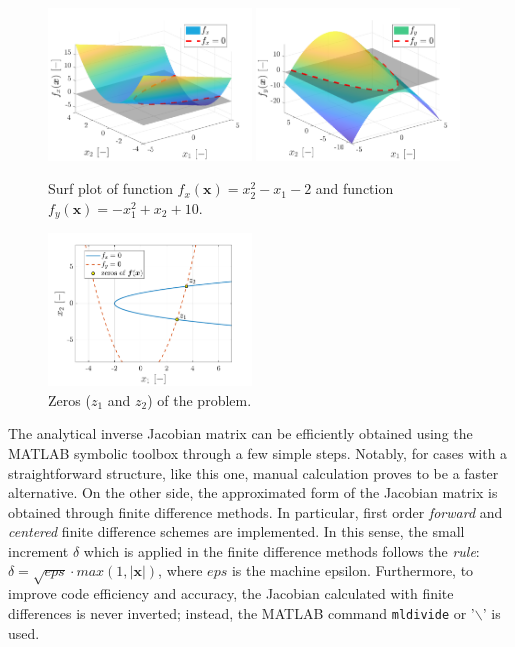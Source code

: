 \documentclass[11pt,a4paper,oneside]{article}
\renewcommand{\vec}[1]{\mathbf{#1}}
\begin{document}
\begin{figure}[h]
    \centering
    \includegraphics[width = 0.48\textwidth]{gfx/ex1_1.pdf}
    \includegraphics[width = 0.48\textwidth]{gfx/ex1_2.pdf}
    \caption{Surf plot of function $f_x(\vec{x})=x_2^2-x_1-2$ and function $f_y(\vec{x})=-x_1^2+x_2+10$.}\label{fig:ex1_1}
\end{figure}

\begin{figure}
    \centering
    \vspace{-0.3cm}
    
        \includegraphics[width = 0.48\textwidth]{gfx/ex1_3.pdf}
        \caption{Zeros ($z_1$ and $z_2$) of the problem.}\label{fig:ex1_2}
\end{figure}
The analytical inverse Jacobian matrix can be efficiently obtained using the MATLAB symbolic toolbox 
through a few simple steps. Notably, for cases with a straightforward structure, like this one, 
manual calculation proves to be a faster alternative.
 On the other side, the approximated form of the Jacobian matrix is obtained 
through finite difference methods. In particular, first order \textit{forward} and \textit{centered} 
finite difference schemes are implemented. In this sense, the small increment $\delta$ which is applied 
in the finite difference methods follows the \textit{rule}: 
$\delta=\sqrt{eps}\cdot max(1, |\vec{x}|)$, where $eps$ is the machine epsilon. 
Furthermore, to improve code efficiency and accuracy, the Jacobian calculated with finite differences 
is never inverted; instead, the MATLAB command \texttt{mldivide} or '$\backslash$' is used. 
\end{document}
